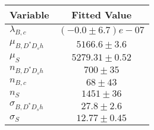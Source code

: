 \begin{tabular}[t]{lc}
\hline
Variable &Fitted Value\\
\hline\hline
$\lambda_{B,c}$&$(-0.0\pm6.7)e-07$\\
\hline
$\mu_{B, D^* D_s h}$&$5166.6\pm3.6$\\
\hline
$\mu_S$&$5279.31\pm0.52$\\
\hline
$n_{B, D^* D_s h}$&$700\pm35$\\
\hline
$n_{B,c}$&$68\pm43$\\
\hline
$n_S$&$1451\pm36$\\
\hline
$\sigma_{B, D^* D_s h}$&$27.8\pm2.6$\\
\hline
$\sigma_S$&$12.77\pm0.45$\\
\hline
\end{tabular}